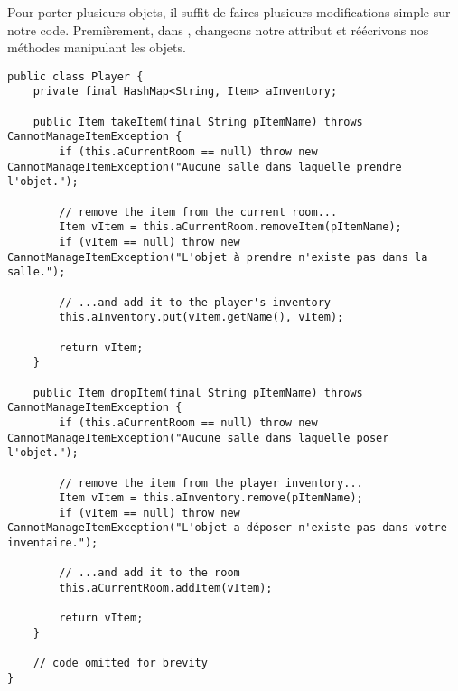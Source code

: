 \begin{exercise}[subtitle=Plusieurs items et ItemList]

Pour porter plusieurs objets, il suffit de faires plusieurs modifications simple sur notre code. Premièrement, dans , changeons notre attribut et réécrivons nos méthodes manipulant les objets.

\begin{verbatim}
public class Player {
    private final HashMap<String, Item> aInventory;

    public Item takeItem(final String pItemName) throws CannotManageItemException {
        if (this.aCurrentRoom == null) throw new CannotManageItemException("Aucune salle dans laquelle prendre l'objet.");

        // remove the item from the current room...
        Item vItem = this.aCurrentRoom.removeItem(pItemName);
        if (vItem == null) throw new CannotManageItemException("L'objet à prendre n'existe pas dans la salle.");

        // ...and add it to the player's inventory
        this.aInventory.put(vItem.getName(), vItem);

        return vItem;
    }

    public Item dropItem(final String pItemName) throws CannotManageItemException {
        if (this.aCurrentRoom == null) throw new CannotManageItemException("Aucune salle dans laquelle poser l'objet.");

        // remove the item from the player inventory...
        Item vItem = this.aInventory.remove(pItemName);
        if (vItem == null) throw new CannotManageItemException("L'objet a déposer n'existe pas dans votre inventaire.");

        // ...and add it to the room
        this.aCurrentRoom.addItem(vItem);

        return vItem;
    }
    
    // code omitted for brevity
}
\end{verbatim}
\end{exercise}

